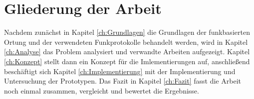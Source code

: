 \section{Gliederung der Arbeit}
\label{ch:Einleitung:sec:Gliederung}
Nachdem zunächst in Kapitel \ref{ch:Grundlagen} die Grundlagen der funkbasierten Ortung und der verwendeten Funkprotokolle behandelt werden, wird in Kapitel \ref{ch:Analyse} das Problem analysiert und verwandte Arbeiten aufgezeigt.
Kapitel \ref{ch:Konzept} stellt dann ein Konzept für die Imlementierungen auf, anschließend beschäftigt sich Kapitel \ref{ch:Implementierung} mit der Implementierung und Untersuchung der Prototypen. 
Das Fazit in Kapitel \ref{ch:Fazit} fasst die Arbeit noch einmal zusammen, vergleicht und bewertet die Ergebnisse.
